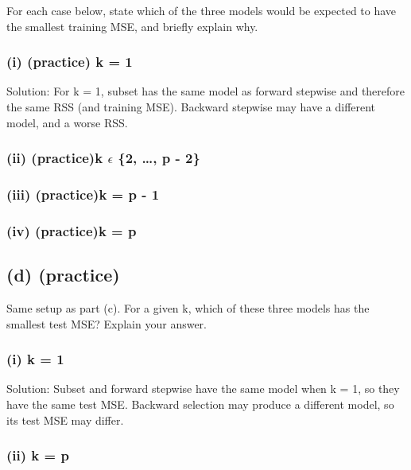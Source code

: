 \documentclass[
]{article}
\begin{document}
For each case below, state which of the three models would be expected
to have the smallest training MSE, and briefly explain why.

\subsubsection{(i) (practice) k = 1}\label{i-practice-k-1}

Solution: For k = 1, subset has the same model as forward stepwise and
therefore the same RSS (and training MSE). Backward stepwise may have a
different model, and a worse RSS.

\subsubsection{\texorpdfstring{(ii) (practice)k \({\epsilon}\) \{2,
\ldots, p -
2\}}{(ii) (practice)k \{\textbackslash epsilon\} \{2, \ldots, p - 2\}}}\label{ii-practicek-epsilon-2-p---2}

\subsubsection{(iii) (practice)k = p - 1}\label{iii-practicek-p---1}

\subsubsection{(iv) (practice)k = p}\label{iv-practicek-p}

\subsection{(d) (practice)}\label{d-practice}

Same setup as part (c). For a given k, which of these three models has
the smallest test MSE? Explain your answer.

\subsubsection{(i) k = 1}\label{i-k-1}

Solution: Subset and forward stepwise have the same model when k = 1, so
they have the same test MSE. Backward selection may produce a different
model, so its test MSE may differ.

\subsubsection{(ii) k = p}\label{ii-k-p}
\end{document}
